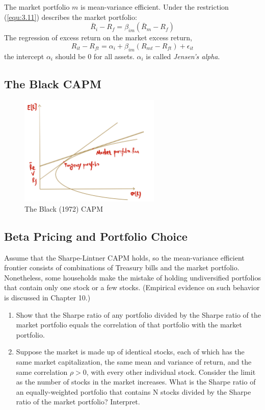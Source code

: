\documentclass[11pt,green,twocol,citestyle=authoryear, bibstyle=authoryear]{elegantbook}
\begin{document}
The market portfolio $ m $ is mean-variance efficient. Under the restriction (\ref{equ:3.11}) describes the market portfolio:
\begin{equation}\label{equ:3.12}
    \bar{R}_i-R_f=\beta_{i m}\left(\bar{R}_m-R_f\right)
\end{equation}
The regression of excess return on the market excess return,
\begin{equation}\label{equ:3.13}
    R_{i t}-R_{f t}=\alpha_i+\beta_{i m}\left(R_{m t}-R_{f t}\right)+\epsilon_{i t}
\end{equation}
the intercept $ \alpha_i $ should be $ 0 $ for all assets. $ \alpha_i $ is called \textit{Jensen's alpha}.

\subsection{The Black CAPM}
\begin{figure}[!h]
    \centering
    \includegraphics[width = 0.6\textwidth]{blackcapm.pdf}
    \caption{The Black (1972) CAPM}
\end{figure}

\subsection{Beta Pricing and Portfolio Choice}

\begin{problem}
    Assume that the Sharpe-Lintner CAPM holds, so the mean-variance efficient frontier consists of combinations of Treasury bills and the market portfolio. Nonetheless, some households make the mistake of holding undiversified portfolios that contain only one stock or a few stocks. (Empirical evidence on such behavior is discussed in Chapter 10.)
    \begin{enumerate}
        \item Show that the Sharpe ratio of any portfolio divided by the Sharpe ratio of the market
        portfolio equals the correlation of that portfolio with the market portfolio.
        \item Suppose the market is made up of identical stocks, each of which has the same market capitalization, the same mean and variance of return, and the same correlation $ \rho > 0 $, with every other individual stock. Consider the limit as the number of stocks
        in the market increases. What is the Sharpe ratio of an equally-weighted portfolio
        that contains N stocks divided by the Sharpe ratio of the market portfolio? Interpret.
    \end{enumerate}
\end{problem}
\end{document}
